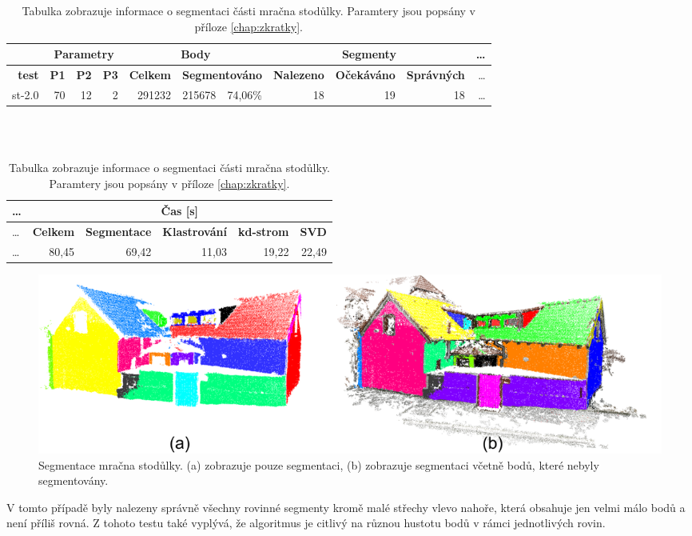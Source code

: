 \documentclass[11pt,twoside,a4paper]{book}
\begin{document}
\begin{changeheight}{3cm}
\begin{table}[ht]
\resizebox{\textwidth}{!} {
\begin{tabular}{|r|r|r|r|r|r|r|r|r|r|r|}
\hline
&\multicolumn{3}{c|}{\textbf{Parametry}} & \multicolumn{3}{c|}{\textbf{Body}} & \multicolumn{3}{c|}{\textbf{Segmenty}}&\ldots\\ \hline
\textbf{test} & \textbf{P1} & \textbf{P2} & \textbf{P3} & \textbf{Celkem} & \multicolumn{2}{c|}{\textbf{Segmentováno}} & \textbf{Nalezeno} & \textbf{Očekáváno} & \textbf{Správných} &\ldots\\ \hline
st-2.0 & 70 & 12 & 2 & 291232 & 215678 & 74,06\% & 18 & 19 & 18 &\ldots\\ \hline
\end{tabular}
}\\ \\
\begin{flushright} \scalebox{0.9} {
\begin{tabular}{|l|r|r|r|r|r|}
\hline
\ldots&\multicolumn{5}{|c|}{\textbf{Čas [s]}} \\ \hline
\ldots&\textbf{Celkem} & \textbf{Segmentace} & \textbf{Klastrování} & \textbf{kd-strom} & \textbf{SVD} \\\hline
\ldots&80,45 & 69,42 & 11,03 & 19,22 & 22,49 \\ \hline
\end{tabular}
}\end{flushright}

\caption{Tabulka zobrazuje informace o segmentaci části mračna stodůlky. Paramtery jsou popsány v příloze \ref{chap:zkratky}.} 
\label{table:test-st-2}
\end{table}

\begin{figure}[H]
\begin{center}
\includegraphics[width=\textwidth]{figures/test-st-2}
\caption{Segmentace mračna stodůlky. (a) zobrazuje pouze segmentaci, (b) zobrazuje segmentaci včetně bodů, které nebyly segmentovány.}
\label{fig:test-st-2}
\end{center}
\end{figure}
V tomto případě byly nalezeny správně všechny rovinné segmenty kromě malé střechy vlevo nahoře, která obsahuje jen velmi málo bodů a není příliš rovná. Z tohoto testu také vyplývá, že algoritmus je citlivý na různou hustotu bodů v rámci jednotlivých rovin.
\end{changeheight}
\end{document}
